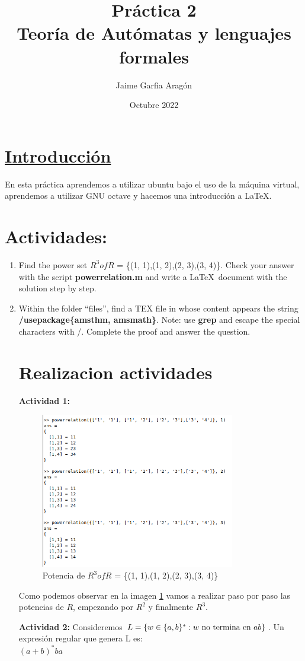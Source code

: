 \documentclass[titlepage,12pt]{article}
\title{\textbf{Práctica 2 \\ Teoría de Autómatas y lenguajes formales}}
\author{Jaime Garfia Aragón}
\date{Octubre 2022}
\begin{document}
\maketitle

\section*{\textbf{\underline{Introducción}}}
En esta práctica aprendemos a utilizar ubuntu bajo el uso de la máquina virtual, aprendemos a utilizar GNU octave y hacemos una introducción a \LaTeX.

\section*{\textbf{}{Actividades:}}

\begin{enumerate}
        \item Find the power set $R^3
of R$ = \{(1, 1),(1, 2),(2, 3),(3, 4)\}. Check your answer with the script \textbf{powerrelation.m} and write a   \LaTeX \ document with the
solution step by step.
    
    \item Within the folder “files”, find a TEX file in whose content appears the string \\
\textbf{/usepackage\{amsthm, amsmath\}}. Note: use \textbf{grep} and escape the special
characters with /. Complete the proof and answer the question.

\newpage
\section*{Realizacion actividades}
\textbf{Actividad 1:}

\begin{figure}[h]
    \centering
    \includegraphics[width=0.8\textwidth]{Powerrelation.png}
    \caption{Potencia de $R^3
of R$ = \{(1, 1),(1, 2),(2, 3),(3, 4)\}}
    \label{fig:fig1}
\end{figure}
Como podemos observar en la imagen \ref{fig:fig1} vamos a realizar paso por paso las potencias de $R$, empezando por $R^2$ y finalmente $R^3$.

\textbf{Actividad 2:}
Consideremos $L=\{w\in \{a,b\}^* : w \textnormal{ no termina en } ab\}$. Un expresión regular que genera L es: \\
$(a+b)^* ba $


\end{enumerate}
\end{document}
